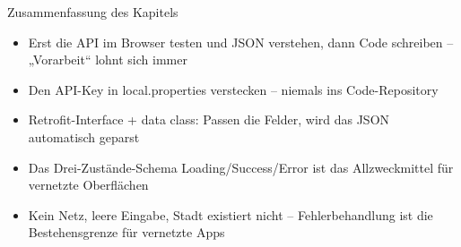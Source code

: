 \begin{tcbsummary}{Zusammenfassung des Kapitels}
\begin{itemize}
  \item Erst die API im Browser testen und JSON verstehen, dann Code schreiben – „Vorarbeit“ lohnt sich immer
  \item Den API-Key in local.properties verstecken – niemals ins Code-Repository
  \item Retrofit-Interface + data class: Passen die Felder, wird das JSON automatisch geparst
  \item Das Drei-Zustände-Schema Loading/Success/Error ist das Allzweckmittel für vernetzte Oberflächen
  \item Kein Netz, leere Eingabe, Stadt existiert nicht – Fehlerbehandlung ist die Bestehensgrenze für vernetzte Apps
\end{itemize}

\end{tcbsummary}
